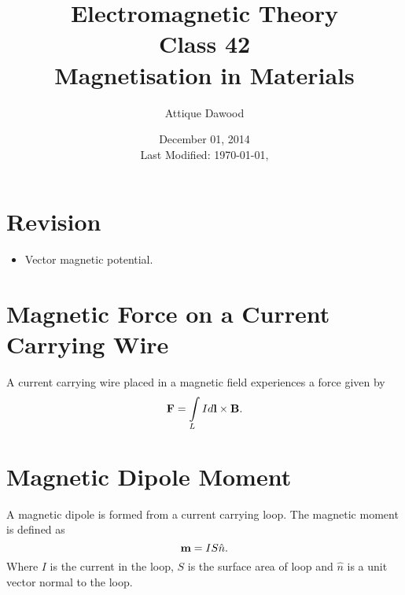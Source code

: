 \documentclass[12pt,a4paper]{article}
\title{Electromagnetic Theory\\Class 42\\Magnetisation in Materials}
\author{Attique Dawood}
\date{December 01, 2014\\[0.2cm] Last Modified: \today, \currenttime}
\begin{document}
\maketitle
\section{Revision}
\begin{itemize}
\item Vector magnetic potential.
\end{itemize}
\section{Magnetic Force on a Current Carrying Wire}
A current carrying wire placed in a magnetic field experiences a force given by
\begin{equation}
\mathrm{\textbf F}=\int\limits_L Id\textbf{l}\times\mathrm{\textbf B}.
\end{equation}
\section{Magnetic Dipole Moment}
A magnetic dipole is formed from a current carrying loop. The magnetic moment is defined as
\begin{equation}
\mathrm{\textbf m}=IS\hat n.
\end{equation}
Where $I$ is the current in the loop, $S$ is the surface area of loop and $\hat n$ is a unit vector normal to the loop.
\end{document}
